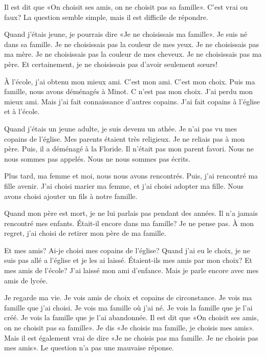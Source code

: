 \documentclass[letterpaper]{article}
\begin{document}
\doublespacing
Il est dit que «On choisit ses amis, on ne choisit pas sa famille». C'est vrai ou faux? La question semble simple, mais il est difficile de répondre.

Quand j'étais jeune, je pourrais dire «Je ne choisissais ma famille».
Je suis né dans sa famille.
Je ne choisissais pas la couleur de mes yeux.
Je ne choisissais pas ma mère.
Je ne choisissais pas la couleur de mes cheveux.
Je ne choisissais pas ma père.
Et certainement, je ne choisissais pas d'avoir seulement sœurs!

À l'école, j'ai obtenu mon mieux ami. C'est mon ami. C'est mon choix. Puis ma famille, nous avons déménagés à Minot. C n'est pas mon choix. J'ai perdu mon mieux ami. Mais j'ai fait connaissance d'autres copains. J'ai fait copains à l'église et à l'école.

Quand j'étais un jeune adulte, je suis devenu un athée. Je n'ai pas vu mes copains de l'église. Mes parents étaient très religieux. Je ne reliais pas à mon père. Puis, il a déménagé à la Floride. Il n'était pas mon parent favori. Nous ne nous sommes pas appelés. Nous ne nous sommes pas écrits.

Plus tard, ma femme et moi, nous nous avons rencontrés. Puis, j'ai rencontré ma fille avenir. J'ai choisi marier ma femme, et j'ai choisi adopter ma fille. Nous avons choisi ajouter un fils à notre famille.

Quand mon père est mort, je ne lui parlais pas pendant des années. Il n'a jamais rencontré mes enfants. Était-il encore dans ma famille? Je ne pense pas. À mon regret, j'ai choisi de retirer mon père de ma famille.

Et mes amis? Ai-je choisi mes copains de l'église? Quand j'ai eu le choix, je ne suis pas allé a l'église et je les ai laissé. Étaient-ils mes amis par mon choix? Et mes amis de l'école? J'ai laissé mon ami d'enfance. Mais je parle encore avec mes amis de lycée.

Je regarde ma vie. Je vois amis de choix et copains de circonstance. Je vois ma famille que j'ai choisi. Je vois ma famille où j'ai né. Je vois la famille que je l'ai créé. Je vois la famille que je l'ai abandonnée. Il est dit que 
«On choisit ses amis, on ne choisit pas sa famille». Je dis «Je choisis ma famille, je choisis mes amis». Mais il est également vrai de dire «Je ne choisis pas ma famille. Je ne choisis pas mes amis». Le question n'a pas une mauvaise réponse.
\end{document}
